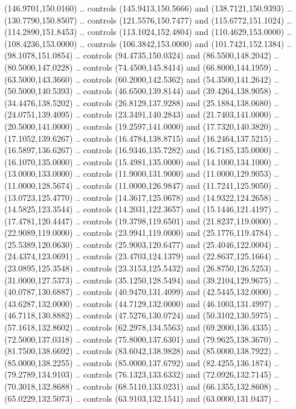   (146.9701,150.0160) .. controls (145.9413,150.5666) and (138.7121,150.9393) ..
  (130.7790,150.8507) .. controls (121.5576,150.7477) and (115.6772,151.1024) ..
  (114.2890,151.8453) .. controls (113.1024,152.4804) and (110.4629,153.0000) ..
  (108.4236,153.0000) .. controls (106.3842,153.0000) and (101.7421,152.1384) ..
  (98.1078,151.0854) .. controls (94.4735,150.0324) and (86.5500,148.2042) ..
  (80.5000,147.0228) .. controls (74.4500,145.8414) and (66.8000,144.1959) ..
  (63.5000,143.3660) .. controls (60.2000,142.5362) and (54.3500,141.2642) ..
  (50.5000,140.5393) .. controls (46.6500,139.8144) and (39.4264,138.9058) ..
  (34.4476,138.5202) .. controls (26.8129,137.9288) and (25.1884,138.0680) ..
  (24.0751,139.4095) .. controls (23.3491,140.2843) and (21.7403,141.0000) ..
  (20.5000,141.0000) .. controls (19.2597,141.0000) and (17.7320,140.3820) ..
  (17.1052,139.6267) .. controls (16.4784,138.8715) and (16.2464,137.5215) ..
  (16.5897,136.6267) .. controls (16.9346,135.7282) and (16.7185,135.0000) ..
  (16.1070,135.0000) .. controls (15.4981,135.0000) and (14.1000,134.1000) ..
  (13.0000,133.0000) .. controls (11.9000,131.9000) and (11.0000,129.9053) ..
  (11.0000,128.5674) .. controls (11.0000,126.9847) and (11.7241,125.9050) ..
  (13.0723,125.4770) .. controls (14.3617,125.0678) and (14.9322,124.2658) ..
  (14.5825,123.3544) .. controls (14.2031,122.3657) and (15.1446,121.4197) ..
  (17.4781,120.4447) .. controls (19.3798,119.6501) and (21.8237,119.0000) ..
  (22.9089,119.0000) .. controls (23.9941,119.0000) and (25.1776,119.4784) ..
  (25.5389,120.0630) .. controls (25.9003,120.6477) and (25.4046,122.0004) ..
  (24.4374,123.0691) .. controls (23.4703,124.1379) and (22.8637,125.1664) ..
  (23.0895,125.3548) .. controls (23.3153,125.5432) and (26.8750,126.5253) ..
  (31.0000,127.5373) .. controls (35.1250,128.5494) and (39.2104,129.9675) ..
  (40.0787,130.6887) .. controls (40.9470,131.4099) and (42.5445,132.0000) ..
  (43.6287,132.0000) .. controls (44.7129,132.0000) and (46.1003,131.4997) ..
  (46.7118,130.8882) .. controls (47.5276,130.0724) and (50.3102,130.5975) ..
  (57.1618,132.8602) .. controls (62.2978,134.5563) and (69.2000,136.4335) ..
  (72.5000,137.0318) .. controls (75.8000,137.6301) and (79.9625,138.3670) ..
  (81.7500,138.6692) .. controls (83.6042,138.9828) and (85.0000,138.7922) ..
  (85.0000,138.2255) .. controls (85.0000,137.6792) and (82.4255,136.1874) ..
  (79.2789,134.9103) .. controls (76.1323,133.6332) and (72.0926,132.7145) ..
  (70.3018,132.8688) .. controls (68.5110,133.0231) and (66.1355,132.8608) ..
  (65.0229,132.5073) .. controls (63.9103,132.1541) and (63.0000,131.0437) ..
